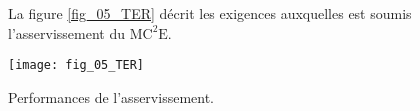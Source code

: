 %


\ifprof
\else

La figure \ref{fig_05_TER} décrit les exigences auxquelles est soumis l'asservissement du $\text{MC}^2\text{E}$.

\begin{marginfigure}
\texttt{[image: fig\_05\_TER]}
\caption{Performances de l'asservissement. \label{fig_05_TER}}
\end{marginfigure}
\fi


